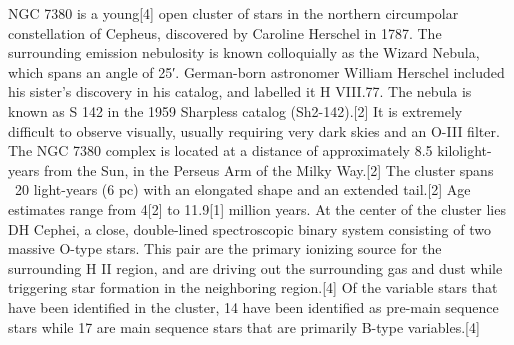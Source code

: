 NGC 7380 is a young[4] open cluster of stars in the northern circumpolar constellation of Cepheus, discovered by Caroline Herschel in 1787. The surrounding emission nebulosity is known colloquially as the Wizard Nebula, which spans an angle of 25′. German-born astronomer William Herschel included his sister's discovery in his catalog, and labelled it H VIII.77. The nebula is known as S 142 in the 1959 Sharpless catalog (Sh2-142).[2] It is extremely difficult to observe visually, usually requiring very dark skies and an O-III filter. The NGC 7380 complex is located at a distance of approximately 8.5 kilolight-years from the Sun, in the Perseus Arm of the Milky Way.[2] The cluster spans ~20 light-years (6 pc) with an elongated shape and an extended tail.[2] Age estimates range from 4[2] to 11.9[1] million years. At the center of the cluster lies DH Cephei, a close, double-lined spectroscopic binary system consisting of two massive O-type stars. This pair are the primary ionizing source for the surrounding H II region, and are driving out the surrounding gas and dust while triggering star formation in the neighboring region.[4] Of the variable stars that have been identified in the cluster, 14 have been identified as pre-main sequence stars while 17 are main sequence stars that are primarily B-type variables.[4]
